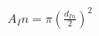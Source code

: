 \documentclass[preview]{standalone}
\begin{document}
\begin{align*}
A_In = \pi \left(\frac{d_{In}}{2}\right)^2
\end{align*}
\end{document}
